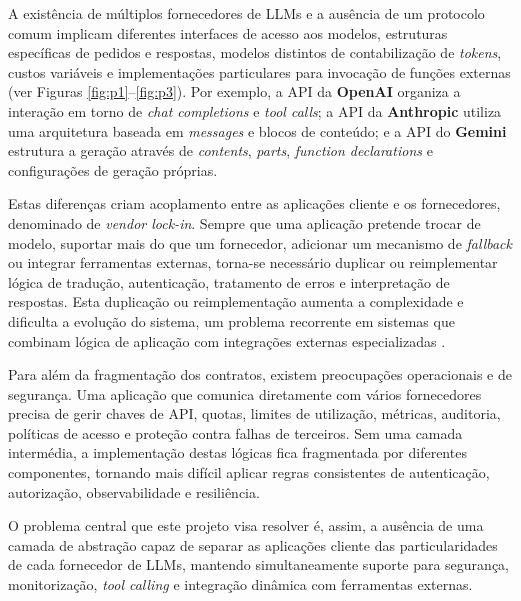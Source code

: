     A existência de múltiplos fornecedores de LLMs e a ausência de um protocolo comum implicam
    diferentes interfaces de acesso aos modelos, estruturas específicas de pedidos e respostas, modelos distintos de contabilização de \textit{tokens}, custos variáveis e implementações particulares para invocação de funções externas (ver Figuras \ref{fig:p1}--\ref{fig:p3}). Por exemplo, a API da \textbf{OpenAI} \cite{openai_api} organiza a interação em torno de \textit{chat completions} e \textit{tool calls}; a API da \textbf{Anthropic} \cite{anthropic_api} utiliza uma arquitetura baseada em \textit{messages} e blocos de conteúdo; e a API do \textbf{Gemini} \cite{google_gemini_api} estrutura a geração através de \textit{contents}, \textit{parts}, \textit{function declarations} e configurações de geração próprias.

    Estas diferenças criam acoplamento entre as aplicações cliente e os fornecedores, denominado de \textit{vendor lock-in}. Sempre que uma aplicação pretende trocar de modelo, suportar mais do que um fornecedor, adicionar um mecanismo de \textit{fallback} ou integrar ferramentas externas, torna-se necessário duplicar ou reimplementar lógica de tradução, autenticação, tratamento de erros e interpretação de respostas. Esta duplicação ou reimplementação aumenta a complexidade e dificulta a evolução do sistema, um problema recorrente em sistemas que combinam lógica de aplicação com integrações externas especializadas \cite{cloudzero_ai_vendor_lock_in}.

    Para além da fragmentação dos contratos, existem preocupações operacionais e de segurança. Uma aplicação que comunica diretamente com vários fornecedores precisa de gerir chaves de API, quotas, limites de utilização, métricas, auditoria, políticas de acesso e proteção contra falhas de terceiros. Sem uma camada intermédia, a implementação destas lógicas fica fragmentada por diferentes componentes, tornando mais difícil aplicar regras consistentes de autenticação, autorização, observabilidade e resiliência.

    O problema central que este projeto visa resolver é, assim, a ausência de uma camada de abstração capaz de separar as aplicações cliente das particularidades de cada fornecedor de LLMs, mantendo simultaneamente suporte para segurança, monitorização, \textit{tool calling} e integração dinâmica com ferramentas externas.


